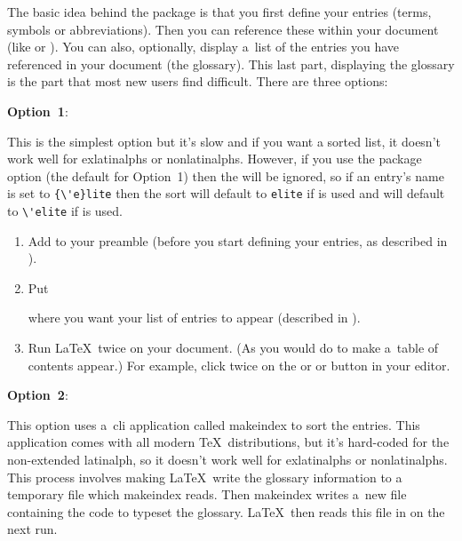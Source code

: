 \documentclass[report,inlinetitle]{nlctdoc}
\makeatletter
\newcommand*{\optionlabel}[1]{%
 \@glstarget{option#1}{}\textbf{Option~#1}}
\makeatother
\begin{document}
The basic idea behind the  package is that you
first define your entries (terms, symbols or abbreviations). Then
you can reference these within your document (like  or
).  You can also, optionally, display a~list of the entries
you have referenced in your document (the glossary). This last part,
displaying the glossary is the part that most new users find
difficult. There are three options:

\begin{description}
\item[]\optionlabel1: 

 This is the simplest option but it's slow and if
 you want a sorted list, it doesn't work well for \glspl{exlatinalph} or 
 \glspl{nonlatinalph}. However, if you use the
  package option (the default for
 Option~1) then the  will be
 ignored, so if an entry's name is set to \verb|{\'e}lite| then the
 sort will default to \texttt{elite} if 
  is used
 and will default to \verb|\'elite| if 
 is used.

  \begin{enumerate}
    \item Add  to your preamble (before you
    start defining your entries, as described in
    ).

    \item Put
\begin{definition}
\end{definition}
    where you want your list of entries to appear (described in
    ).

    \item Run \LaTeX\ twice on your document. (As you would do to
    make a~table of contents appear.) For example, click twice on
    the  or  or  button in your editor.
  \end{enumerate}

\item\optionlabel2:

   This option uses a~\gls{cli} application called \gls{makeindex} to sort 
   the entries. This application comes with all modern \TeX\ distributions, 
   but it's hard-coded for the non-extended \gls{latinalph}, so 
   it doesn't work well for \glspl{exlatinalph} or
   \glspl{nonlatinalph}. This process involves making \LaTeX\ write the 
   glossary information to a temporary file which \gls{makeindex} reads. 
   Then \gls{makeindex} writes a~new file containing the code to typeset 
   the glossary. \LaTeX\ then reads this file in on the next run.


\end{description}
\end{document}
